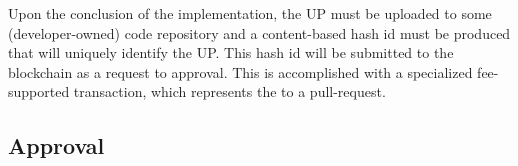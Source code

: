 
Upon the conclusion of the implementation, the UP must be uploaded to some (developer-owned) code repository and a content-based hash id must be produced that will uniquely identify the UP. This hash id will be submitted to the blockchain as a request to approval. This is accomplished with a specialized fee-supported  transaction, which represents the  to a pull-request.

\subsection{Approval}



